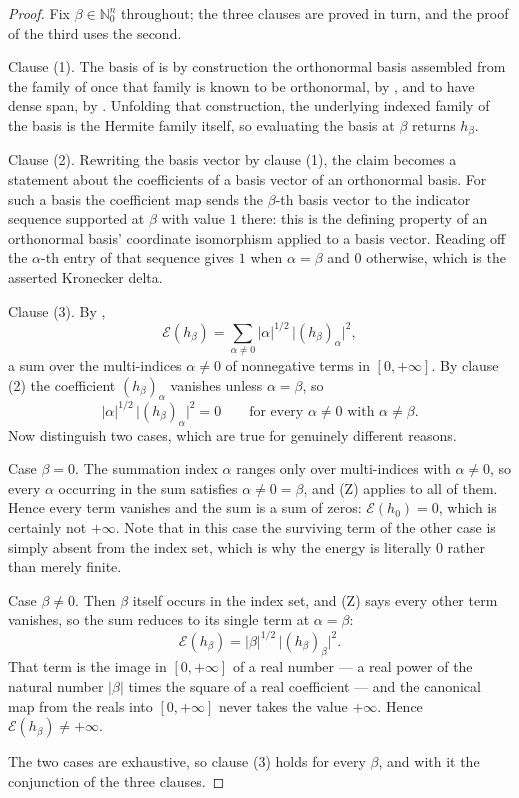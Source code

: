 \begin{proof}
Fix $\beta \in \mathbb{N}_0^n$ throughout; the three clauses are proved in turn,
and the proof of the third uses the second.

Clause (1).  The basis of  is by construction the
orthonormal basis assembled from the family of  once that
family is known to be orthonormal, by , and to
have dense span, by .  Unfolding that construction,
the underlying indexed family of the basis is the Hermite family itself, so
evaluating the basis at $\beta$ returns $h_\beta$.

Clause (2).  Rewriting the basis vector by clause (1), the claim becomes a
statement about the coefficients of a basis vector of an orthonormal basis.  For
such a basis the coefficient map sends the $\beta$-th basis vector to the
indicator sequence supported at $\beta$ with value $1$ there: this is the
defining property of an orthonormal basis' coordinate isomorphism applied to a
basis vector.  Reading off the $\alpha$-th entry of that sequence gives $1$ when
$\alpha = \beta$ and $0$ otherwise, which is the asserted Kronecker delta.

Clause (3).  By ,
\[
  \mathcal{E}(h_\beta)
    = \sum_{\alpha \neq 0} |\alpha|^{1/2}\,\bigl|(h_\beta)_\alpha\bigr|^2 ,
\]
a sum over the multi-indices $\alpha \neq 0$ of nonnegative terms in
$[0,+\infty]$.  By clause (2) the coefficient $(h_\beta)_\alpha$ vanishes unless
$\alpha = \beta$, so
\[
  |\alpha|^{1/2}\,\bigl|(h_\beta)_\alpha\bigr|^2 = 0
  \qquad \text{for every } \alpha \neq 0 \text{ with } \alpha \neq \beta .
  \tag{Z}
\]
Now distinguish two cases, which are true for genuinely different reasons.

Case $\beta = 0$.  The summation index $\alpha$ ranges only over multi-indices
with $\alpha \neq 0$, so every $\alpha$ occurring in the sum satisfies
$\alpha \neq 0 = \beta$, and (Z) applies to all of them.  Hence every term
vanishes and the sum is a sum of zeros:
$\mathcal{E}(h_0) = 0$, which is certainly not $+\infty$.  Note that in this
case the surviving term of the other case is simply absent from the index set,
which is why the energy is literally $0$ rather than merely finite.

Case $\beta \neq 0$.  Then $\beta$ itself occurs in the index set, and (Z) says
every other term vanishes, so the sum reduces to its single term at
$\alpha = \beta$:
\[
  \mathcal{E}(h_\beta) = |\beta|^{1/2}\,\bigl|(h_\beta)_\beta\bigr|^2 .
\]
That term is the image in $[0,+\infty]$ of a real number --- a real power of the
natural number $|\beta|$ times the square of a real coefficient --- and the
canonical map from the reals into $[0,+\infty]$ never takes the value
$+\infty$.  Hence $\mathcal{E}(h_\beta) \neq +\infty$.

The two cases are exhaustive, so clause (3) holds for every $\beta$, and with it
the conjunction of the three clauses.
\end{proof}

